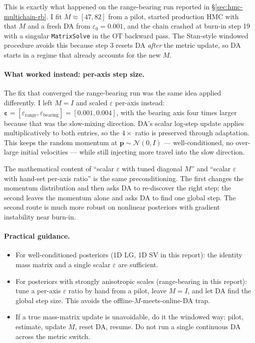 \documentclass{article}
\renewcommand{\v}[1]{ \ensuremath{ {\mathbf{#1}} }}
\begin{document}
This is exactly what happened on the range-bearing run reported in \S\ref{sec:hmc-multichain-rb}. I fit $M \approx [47, 82]$ from a pilot, started production HMC with that $M$ and a fresh DA from $\varepsilon_0 = 0.001$, and the chain crashed at burn-in step 19 with a singular \texttt{MatrixSolve} in the OT backward pass. The Stan-style windowed procedure avoids this because step 3 resets DA \emph{after} the metric update, so DA starts in a regime that already accounts for the new $M$.

\paragraph{What worked instead: per-axis step size.}
The fix that converged the range-bearing run was the same idea applied differently. I left $M = I$ and scaled $\varepsilon$ per-axis instead: $\boldsymbol\varepsilon = [\varepsilon_{\text{range}}, \varepsilon_{\text{bearing}}] = [0.001, 0.004]$, with the bearing axis four times larger because that was the slow-mixing direction. DA's scalar log-step update applies multiplicatively to both entries, so the $4\times$ ratio is preserved through adaptation. This keeps the random momentum at $\v p \sim \mathcal{N}(0, I)$ --- well-conditioned, no over-large initial velocities --- while still injecting more travel into the slow direction.

The mathematical content of ``scalar $\varepsilon$ with tuned diagonal $M$'' and ``scalar $\varepsilon$ with hand-set per-axis ratio'' is the same preconditioning. The first changes the momentum distribution and then asks DA to re-discover the right step; the second leaves the momentum alone and asks DA to find one global step. The second route is much more robust on nonlinear posteriors with gradient instability near burn-in.

\paragraph{Practical guidance.}
\begin{itemize}
\item For well-conditioned posteriors (1D LG, 1D SV in this report): the identity mass matrix and a single scalar $\varepsilon$ are sufficient.
\item For posteriors with strongly anisotropic scales (range-bearing in this report): tune a per-axis $\varepsilon$ ratio by hand from a pilot, leave $M = I$, and let DA find the global step size. This avoids the offline-$M$-meets-online-DA trap.
\item If a true mass-matrix update is unavoidable, do it the windowed way: pilot, estimate, update $M$, reset DA, resume. Do not run a single continuous DA across the metric switch.
\end{itemize}
\end{document}
